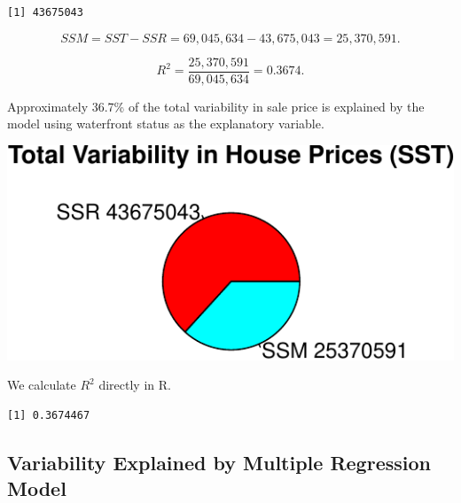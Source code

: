 \documentclass[
  letterpaper,
  DIV=11,
  numbers=noendperiod]{scrreprt}
\newenvironment{Shaded}{\begin{snugshade}}{\end{snugshade}}
\newcommand{\DecValTok}[1]{\textcolor[rgb]{0.68,0.00,0.00}{#1}}
\newcommand{\FunctionTok}[1]{\textcolor[rgb]{0.28,0.35,0.67}{#1}}
\newcommand{\NormalTok}[1]{\textcolor[rgb]{0.00,0.23,0.31}{#1}}
\newcommand{\OtherTok}[1]{\textcolor[rgb]{0.00,0.23,0.31}{#1}}
\newcommand{\SpecialCharTok}[1]{\textcolor[rgb]{0.37,0.37,0.37}{#1}}
\begin{document}
\begin{Shaded}
\end{Shaded}

\begin{verbatim}
[1] 43675043
\end{verbatim}

\[
SSM = SST-SSR = 69,045,634 - 43,675,043 =25,370,591.
\]

\[
R^2 = \frac{25,370,591}{69,045,634}=0.3674.
\]

Approximately 36.7\% of the total variability in sale price is explained
by the model using waterfront status as the explanatory variable.

\includegraphics{Ch2_files/figure-pdf/unnamed-chunk-35-1.pdf}

We calculate \(R^2\) directly in R.

\begin{Shaded}
\end{Shaded}

\begin{verbatim}
[1] 0.3674467
\end{verbatim}

\subsection{Variability Explained by Multiple Regression
Model}\label{variability-explained-by-multiple-regression-model}
\end{document}
